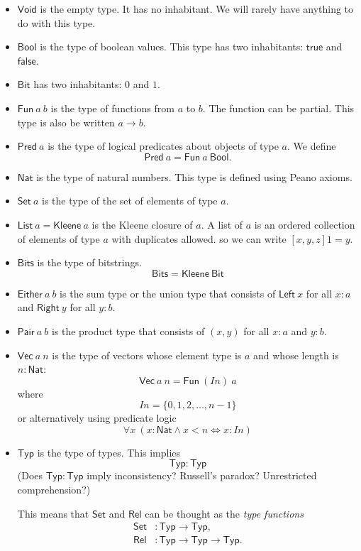 \documentclass[10pt,statementpaper]{memoir}
\theoremstyle{definition}
\newcommand\Fa[1]{\forall#1~}
\newcommand\Typ{\mathsf{Typ}}
\newcommand\Either[2]{\mathsf{Either}~#1~#2}
\newcommand\Left[1]{\mathsf{Left}~#1}
\newcommand\Right[1]{\mathsf{Right}~#1}
\newcommand\Void{\mathsf{Void}}
\newcommand\Bit{\mathsf{Bit}}
\newcommand\Pair[2]{\mathsf{Pair}~#1~#2}
\newcommand\Bool{\mathsf{Bool}}
\newcommand\Bits{\mathsf{Bits}}
\newcommand\true{\mathsf{true}}
\newcommand\false{\mathsf{false}}
\newcommand\List[1]{\mathsf{List}~#1}
\newcommand\Kleene[1]{\mathsf{Kleene}~#1}
\newcommand\Nat{\mathsf{Nat}}
\newcommand\sfFun{\mathsf{Fun}}
\newcommand\sfSet{\mathsf{Set}}
\newcommand\sfRel{\mathsf{Rel}}
\newcommand\sfVec{\mathsf{Vec}}
\newcommand\Vect[2]{\sfVec~#1~#2}
\newcommand\Set[1]{\sfSet~#1}
\newcommand\Fun[2]{\sfFun~#1~#2}
\newcommand\sfPred{\mathsf{Pred}}
\newcommand\Pred[1]{\sfPred~#1}
\begin{document}
\begin{itemize}
    \item
        $\Void$ is the empty type.
        It has no inhabitant.
        We will rarely have anything to do with this type.
    \item
        $\Bool$ is the type of boolean values.
        This type has two inhabitants: $\true$ and $\false$.
    \item
        $\Bit$ has two inhabitants: $0$ and $1$.
    \item
        $\Fun{a}{b}$ is the type of functions from $a$ to $b$.
        The function can be partial.
        This type is also be written $a \to b$.
    \item 
        $\Pred{a}$ is the type of
        logical predicates about objects of type $a$.
        We define
        \[ \Pred{a} = \Fun{a}{\Bool}. \]
    \item
        $\Nat$ is the type of natural numbers.
        This type is defined using Peano axioms.
    \item
        $\Set{a}$ is the type of the set of elements of type $a$.
    \item $\List{a} = \Kleene{a}$ is the Kleene closure of $a$.
        A list of $a$ is an ordered collection of elements of type $a$ with duplicates allowed.
        so we can write $[x,y,z] 1 = y$.
    \item $\Bits$ is the type of bitstrings.
        \[
            \Bits = \Kleene{\Bit}
        \]
    \item $\Either{a}{b}$ is the sum type or the union type
        that consists of $\Left{x}$ for all $x : a$
        and $\Right{y}$ for all $y : b$.
    \item $\Pair{a}{b}$ is the product type
        that consists of $(x,y)$ for all $x : a$ and $y : b$.
    \item
        $\Vect{a}{n}$ is the type of vectors
        whose element type is $a$ and whose length is $n : \Nat$:
        \[ \Vect{a}{n} = \Fun{(I n)}{a} \]
        where
        \[ I n = \{ 0, 1, 2, \ldots, n - 1 \} \]
        or alternatively using predicate logic
        \[ \Fa{x} (x : \Nat \wedge x < n \iff x : I n) \]
    \item $\Typ$ is the type of types.
        This implies
        \[ \Typ : \Typ \]
        (Does $\Typ : \Typ$ imply inconsistency?
        Russell's paradox?
        Unrestricted comprehension?)

        This means that $\sfSet$ and $\sfRel$ can be thought as the \emph{type functions}
        \begin{align*}
            \sfSet &: \Typ \to \Typ,
            \\
            \sfRel &: \Typ \to \Typ \to \Typ.
        \end{align*}
\end{itemize}
\end{document}
